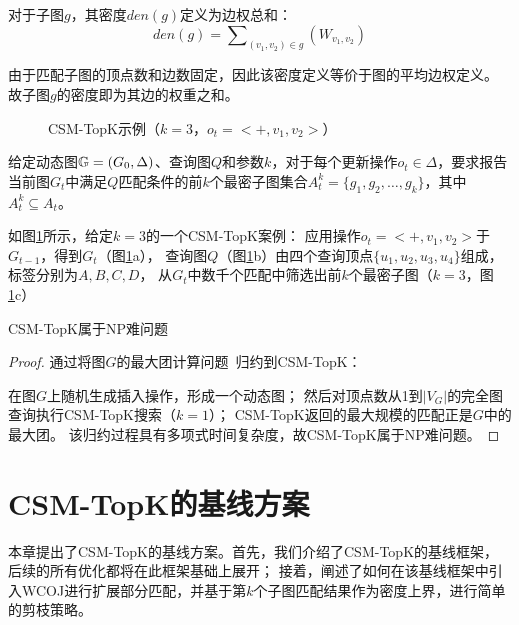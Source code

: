     \begin{definition}[子图密度]\label{def:subgraph-density}

    对于子图$g$，其密度$den(g)$定义为边权总和：
    \[
        den(g) = \sum\nolimits_{(v_1,v_2)\in g}\left(W_{v_1,v_2}\right)
    \]
    
    由于匹配子图的顶点数和边数固定，因此该密度定义等价于图的平均边权定义。
    故子图$g$的密度即为其边的权重之和。
    \end{definition}
    
    \begin{figure}[h!]
        \centering
        \caption{CSM-TopK示例（$k=3$，$o_t=<+,v_{1},v_{2}>$）}
        \label{fig:csm-topk}
    \end{figure}
    
    \begin{definition}\label{def:problem-definition}
    给定动态图$\mathbb{G}=(G_0, \Delta)$、查询图$Q$和参数$k$，对于每个更新操作$o_t\in \Delta$，要求报告当前图$G_t$中满足$Q$匹配条件的前$k$个最密子图集合$A_{t}^k= \{g_1, g_2, \ldots, g_k\}$，其中$A_t^k\subseteq A_t$。
    \end{definition}
    
    如图\ref{fig:csm-topk}所示，给定$k=3$的一个CSM-TopK案例：
    应用操作$o_t=<+,v_1, v_2>$于$G_{t-1}$，得到$G_t$（图\ref{fig:csm-topk}a），
    查询图$Q$（图\ref{fig:csm-topk}b）由四个查询顶点$\{u_1, u_2, u_3, u_4\}$组成，标签分别为$A,B,C,D$，
    从$G_t$中数千个匹配中筛选出前$k$个最密子图（$k=3$，图\ref{fig:csm-topk}c）
    
    \begin{theorem} \label{theorem:np-hard}
    CSM-TopK属于NP难问题
    \end{theorem}
    \begin{proof}
    通过将图$G$的最大团计算问题~\cite{clique-DBLP:journals/eor/WuH15}归约到CSM-TopK：
   
    在图$G$上随机生成插入操作，形成一个动态图；
    然后对顶点数从1到$|V_G|$的完全图查询执行CSM-TopK搜索（$k=1$）；
    CSM-TopK返回的最大规模的匹配正是$G$中的最大团。
    该归约过程具有多项式时间复杂度，故CSM-TopK属于NP难问题。
    \end{proof}
\section{CSM-TopK的基线方案}
本章提出了CSM-TopK的基线方案。首先，我们介绍了CSM-TopK的基线框架，后续的所有优化都将在此框架基础上展开；
接着，阐述了如何在该基线框架中引入WCOJ进行扩展部分匹配，并基于第$k$个子图匹配结果作为密度上界，进行简单的剪枝策略。

